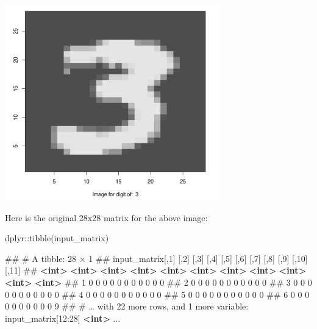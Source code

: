 \documentclass[
  12pt,
]{krantz}
\makeatletter
\newenvironment{Shaded}{\begin{snugshade}}{\end{snugshade}}
\newcommand{\FunctionTok}[1]{\textcolor[rgb]{0,0,0}{#1}}
\newcommand{\KeywordTok}[1]{\textcolor[rgb]{0.27,0.27,0.27}{\textbf{#1}}}
\newcommand{\NormalTok}[1]{#1}
\newcommand{\SpecialCharTok}[1]{\textcolor[rgb]{0,0,0}{#1}}
\newenvironment{kframe}{%
\medskip{}
\setlength{\fboxsep}{.8em}
 \def\at@end@of@kframe{}%
 \ifinner\ifhmode%
  \def\at@end@of@kframe{\end{minipage}}%
  \begin{minipage}{\columnwidth}%
 \fi\fi%
 \def\FrameCommand##1{\hskip\@totalleftmargin \hskip-\fboxsep
 \colorbox{shadecolor}{##1}\hskip-\fboxsep
     \hskip-\linewidth \hskip-\@totalleftmargin \hskip\columnwidth}%
 \MakeFramed {\advance\hsize-\width
   \@totalleftmargin\z@ \linewidth\hsize
   \@setminipage}}%
 {\par\unskip\endMakeFramed%
 \at@end@of@kframe}
\renewenvironment{Shaded}{\begin{kframe}}{\end{kframe}}
\makeatother
\begin{document}
\includegraphics[width=0.7\textwidth,height=\textheight]{images/mnist_image3.png}

Here is the original 28x28 matrix for the above image:

\begin{Shaded}
\begin{Highlighting}[]
\NormalTok{dplyr}\SpecialCharTok{::}\FunctionTok{tibble}\NormalTok{(input\_matrix)}
\end{Highlighting}
\end{Shaded}

\begin{Shaded}
\begin{Highlighting}[]
\NormalTok{\#\# \# A tibble: 28 × 1}
\NormalTok{\#\#   input\_matrix[,1]  [,2]  [,3]  [,4]  [,5]  [,6]  [,7]  [,8]  [,9] [,10] [,11]}
\NormalTok{\#\#              }\KeywordTok{\textless{}int\textgreater{}} \KeywordTok{\textless{}int\textgreater{}} \KeywordTok{\textless{}int\textgreater{}} \KeywordTok{\textless{}int\textgreater{}} \KeywordTok{\textless{}int\textgreater{}} \KeywordTok{\textless{}int\textgreater{}} \KeywordTok{\textless{}int\textgreater{}} \KeywordTok{\textless{}int\textgreater{}} \KeywordTok{\textless{}int\textgreater{}} \KeywordTok{\textless{}int\textgreater{}} \KeywordTok{\textless{}int\textgreater{}}
\NormalTok{\#\# 1                0     0     0     0     0     0     0     0     0     0     0}
\NormalTok{\#\# 2                0     0     0     0     0     0     0     0     0     0     0}
\NormalTok{\#\# 3                0     0     0     0     0     0     0     0     0     0     0}
\NormalTok{\#\# 4                0     0     0     0     0     0     0     0     0     0     0}
\NormalTok{\#\# 5                0     0     0     0     0     0     0     0     0     0     0}
\NormalTok{\#\# 6                0     0     0     0     0     0     0     0     0     0     9}
\NormalTok{\#\# \# … with 22 more rows, and 1 more variable: input\_matrix[12:28] }\KeywordTok{\textless{}int\textgreater{}}
\NormalTok{...}
\end{Highlighting}
\end{Shaded}
\end{document}
